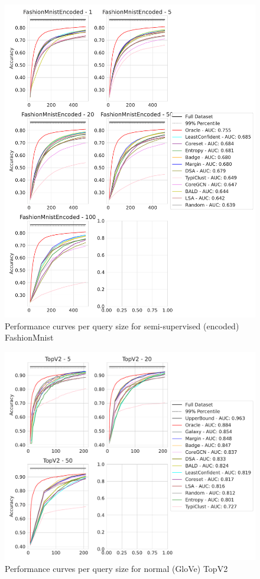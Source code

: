 \documentclass[]{article}
\begin{document}
\begin{figure}[H]
	\centering
	\caption{Performance curves per query size for semi-supervised (encoded) FashionMnist}
	\includegraphics[width=\linewidth]{img/eval_fmnist_enc}
\end{figure}
\begin{figure}[H]
	\centering
	\caption{Performance curves per query size for normal (GloVe) TopV2}
	\includegraphics[width=\linewidth]{img/eval_topv2}
\end{figure}
\end{document}
